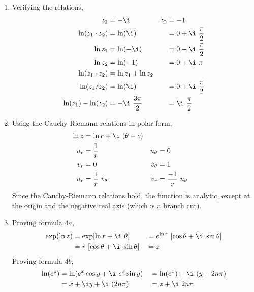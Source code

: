 \begin{enumerate}
    \item Verifying the relations,
          \begin{align}
              z_1                 & = -\i                   &
              z_2                 & = -1                      \\
              \ln(z_1 \cdot z_2)  & = \ln(\i)               &
                                  & = 0 + \i\ \frac{\pi}{2}   \\
              \ln z_1             & = \ln(-\i)              &
                                  & = 0 - \i\ \frac{\pi}{2}   \\
              \ln z_2             & = \ln(-1)               &
                                  & = 0 + \i\ \pi             \\
              \ln(z_1 \cdot z_2)  & = \ln z_1 + \ln z_2       \\
              \ln(z_1 / z_2)      & =\ln(\i)                &
                                  & = 0 + \i\ \frac{\pi}{2}   \\
              \ln(z_1) - \ln(z_2) & = -\i\ \frac{3\pi}{2}   &
                                  & = \i\ \frac{\pi}{2}
          \end{align}

    \item Using the Cauchy Riemann relations in polar form,
          \begin{align}
              \ln z    & = \ln r + \i\ (\theta + c)   \\
              u_r      & = \frac{1}{r}              &
              u_\theta & = 0                          \\
              v_r      & = 0                        &
              v_\theta & = 1                          \\
              u_r      & = \frac{1}{r}\ v_\theta    &
              v_r      & = \frac{-1}{r}\ u_\theta
          \end{align}
          Since the Cauchy-Riemann relations hold, the function is analytic, except at
          the origin and the negative real axis (which is a branch cut).

    \item Proving formula $ 4a $,
          \begin{align}
              \exp(\ln z) & = \exp[\ln r + \i\ \theta]                   &
                          & = e^{\ln r}\ [\cos \theta + \i\ \sin \theta]   \\
                          & = r\ [\cos\theta + \i\ \sin\theta]           &
                          & = z
          \end{align}
          Proving formula $ 4b $,
          \begin{align}
              \ln(e^z) & = \ln(e^x \cos y + \i\ e^x \sin y) &
                       & = \ln(e^x) + \i\ (y + 2n\pi)         \\
                       & = x + \i y + \i\ (2n\pi)           &
                       & = z + \i\ 2n\pi
          \end{align}


\end{enumerate}
